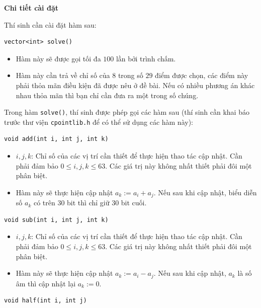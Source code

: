 \textbf{Chi tiết cài đặt}

Thí sinh cần cài đặt hàm sau:

\begin{lstlisting}
vector<int> solve()
\end{lstlisting}

\begin{itemize}
   \item Hàm này sẽ được gọi tối đa $100$ lần bởi trình chấm.
   \item Hàm này cần trả về chỉ số của $8$ trong số $29$ điểm được chọn, các điểm này phải thỏa mãn điều kiện đã được nêu ở đề bài. Nếu có nhiều phương án khác nhau thỏa mãn thì bạn chỉ cần đưa ra một trong số chúng.
\end{itemize}

Trong hàm \texttt{solve()}, thí sinh được phép gọi các hàm sau (thí sinh cần khai báo trước thư viện \texttt{cpointlib.h} để có thể sử dụng các hàm này):

\begin{lstlisting}
void add(int i, int j, int k)
\end{lstlisting}

\begin{itemize}
   \item $i,j,k$: Chỉ số của các vị trí cần thiết để thực hiện thao tác cập nhật. Cần phải đảm bảo $0\le i,j,k\le 63$. Các giá trị này không nhất thiết phải đôi một phân biệt.
   \item Hàm này sẽ thực hiện cập nhật $a_k:=a_i+a_j$. Nếu sau khi cập nhật, biểu diễn số $a_k$ có trên $30$ bit thì chỉ giữ $30$ bit cuối.
\end{itemize}

\begin{lstlisting}
void sub(int i, int j, int k)
\end{lstlisting}

\begin{itemize}
   \item $i,j,k$: Chỉ số của các vị trí cần thiết để thực hiện thao tác cập nhật. Cần phải đảm bảo $0\le i,j,k\le 63$. Các giá trị này không nhất thiết phải đôi một phân biệt.
   \item Hàm này sẽ thực hiện cập nhật $a_k:=a_i-a_j$. Nếu sau khi cập nhật, $a_k$ là số âm thì cập nhật lại $a_k:=0$.
\end{itemize}

\begin{lstlisting}
void half(int i, int j)
\end{lstlisting}

